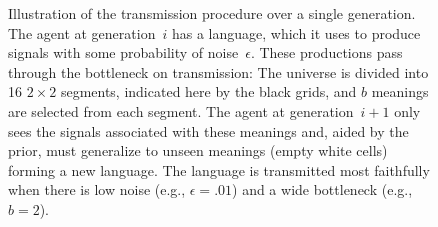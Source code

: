 \documentclass[doc,biblatex]{apa7}
\begin{document}
	\begin{figure}
	\vspace*{2pt}
	\caption{Illustration of the transmission procedure over a single generation. The agent at generation~$i$ has a language, which it uses to produce signals with some probability of noise~$\epsilon$. These productions pass through the bottleneck on transmission: The universe is divided into 16 $2 \times 2$ segments, indicated here by the black grids, and $b$ meanings are selected from each segment. The agent at generation~$i+1$ only sees the signals associated with these meanings and, aided by the prior, must generalize to unseen meanings (empty white cells) forming a new language. The language is transmitted most faithfully when there is low noise (e.g., $\epsilon=.01$) and a wide bottleneck (e.g., $b=2$).}
	\label{fig04}
	\end{figure}
\end{document}
